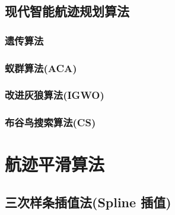 \documentclass[12pt,a4paper,oneside,UTF8]{ctexart}
\begin{document}
\subsection{现代智能航迹规划算法}
\subsubsection{遗传算法}
\subsubsection{蚁群算法(ACA)}
\subsubsection{改进灰狼算法(IGWO)}
\subsubsection{布谷鸟搜索算法(CS)}
\newpage\section{航迹平滑算法}
\subsection{三次样条插值法(Spline 插值)}
\end{document}
